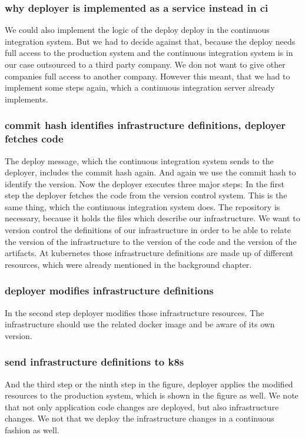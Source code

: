 \subsubsection{why deployer is implemented as a service instead in ci}
We could also implement the logic of the deploy deploy in the continuous integration
system. But we had to decide against that, because the deploy needs full access to the
production system and the continuous integration system is in our case outsourced to a
third party company. We don not want to give other companies full access to another
company. However this meant, that we had to implement some steps again, which a continuous
integration server already implements.

\subsubsection{commit hash identifies infrastructure definitions, deployer fetches code}
The deploy message, which the continuous integration system sends to the deployer,
includes the commit hash again. And again we use the commit hash to identify the
version. Now the deployer executes three major steps: In the first step the deployer
fetches the code from the version control system. This is the same thing, which the
continuous integration system does. The repository is necessary, because it holds the
files which describe our infrastructure. We want to version control the definitions of our
infrastructure in order to be able to relate the version of the infrastructure to the
version of the code and the version of the artifacts. At kubernetes those infrastructure
definitions are made up of different resources, which were already mentioned in the
background chapter.

\subsubsection{deployer modifies infrastructure definitions}
In the second step deployer modifies those infrastructure resources. The infrastructure
should use the related docker image and be aware of its own version.

\subsubsection{send infrastructure definitions to k8s}
And the third step or the ninth step in the figure, deployer applies the modified
resources to the production system, which is shown in the figure as well. We note that not
only application code changes are deployed, but also infrastructure changes. We not that
we deploy the infrastructure changes in a continuous fashion as well.

